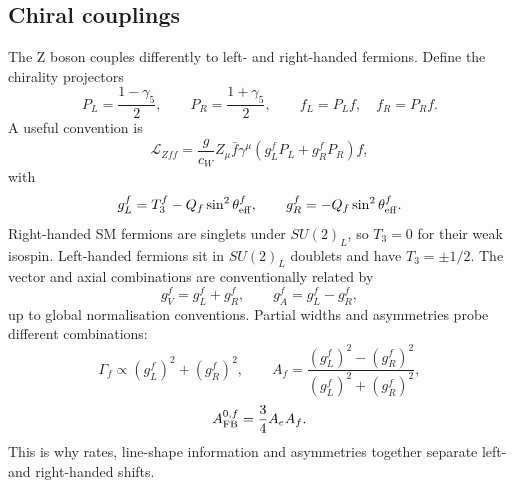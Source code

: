 \documentclass[11pt,a4paper]{report}
\begin{document}
\subsection{Chiral couplings}
The Z boson couples differently to left- and right-handed fermions.  Define the chirality projectors
\begin{equation}
  P_L=\frac{1-\gamma_5}{2},\qquad P_R=\frac{1+\gamma_5}{2},
  \qquad f_L=P_L f,\quad f_R=P_R f.
\end{equation}
A useful convention is
\begin{equation}
  \mathcal L_{Zff}=\frac{g}{c_W}Z_\mu\bar f\gamma^\mu
  \left(g_L^fP_L+g_R^fP_R\right)f,
\end{equation}
with
\begin{equation}
  g_L^f=T_3^f-Q_f\sin^2\theta_{\rm eff}^f,
  \qquad
  g_R^f=-Q_f\sin^2\theta_{\rm eff}^f.
\end{equation}
Right-handed SM fermions are singlets under $SU(2)_L$, so $T_3=0$ for their weak isospin.  Left-handed fermions sit in $SU(2)_L$ doublets and have $T_3=\pm 1/2$.  The vector and axial combinations are conventionally related by
\begin{equation}
  g_V^f=g_L^f+g_R^f,
  \qquad
  g_A^f=g_L^f-g_R^f,
\end{equation}
up to global normalisation conventions.  Partial widths and asymmetries probe different combinations:
\begin{equation}
  \Gamma_f\propto (g_L^f)^2+(g_R^f)^2,
  \qquad
  A_f=\frac{(g_L^f)^2-(g_R^f)^2}{(g_L^f)^2+(g_R^f)^2},
\end{equation}
\begin{equation}
  A_{\rm FB}^{0,f}=\frac{3}{4}A_eA_f.
\end{equation}
This is why rates, line-shape information and asymmetries together separate left- and right-handed shifts.
\end{document}
